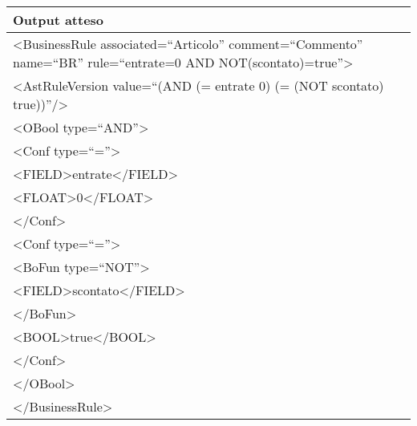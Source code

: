 \begin{center}
\begin{tabular}{|p{11cm}|} \hline
\textbf{Output atteso}\\ \hline
\textless BusinessRule associated=``Articolo'' comment=``Commento'' name=``BR'' rule=``entrate=0 AND NOT(scontato)=true''\textgreater \\
\textless AstRuleVersion value=``(AND (= entrate 0) (= (NOT scontato) true))''/\textgreater \\
 \textless OBool type=``AND''\textgreater \\
 \textless Conf type=``=''\textgreater \\
 \textless FIELD\textgreater entrate\textless /FIELD\textgreater \\
 \textless FLOAT\textgreater 0\textless /FLOAT\textgreater \\
 \textless /Conf\textgreater \\
 \textless Conf type=``=''\textgreater \\
\textless BoFun type=``NOT''\textgreater \\
 \textless FIELD\textgreater scontato\textless /FIELD\textgreater \\
\textless /BoFun\textgreater \\
 \textless BOOL\textgreater true\textless /BOOL\textgreater \\
\textless /Conf\textgreater \\
\textless /OBool\textgreater \\
\textless /BusinessRule\textgreater \\
 \hline
\end{tabular} \\
\end{center}

